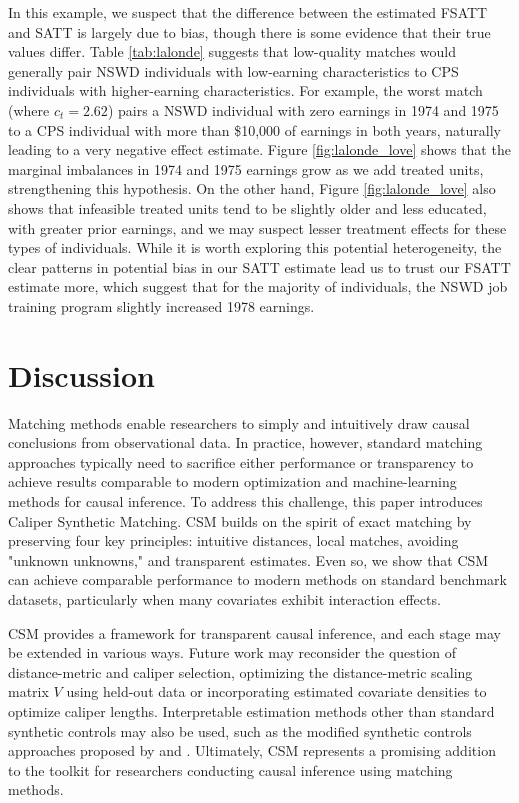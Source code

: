 \documentclass{article}
\begin{document}
In this example, we suspect that the difference between the estimated FSATT and SATT is largely due to bias, though there is some evidence that their true values differ.
Table \ref{tab:lalonde} suggests that low-quality matches would generally pair NSWD individuals with low-earning characteristics to CPS individuals with higher-earning characteristics.
For example, the worst match (where $c_t = 2.62$) pairs a NSWD individual with zero earnings in 1974 and 1975 to a CPS individual with more than \$10,000 of earnings in both years, naturally leading to a very negative effect estimate.
Figure \ref{fig:lalonde_love} shows that the marginal imbalances in 1974 and 1975 earnings grow as we add treated units, strengthening this hypothesis.
On the other hand, Figure \ref{fig:lalonde_love} also shows that infeasible treated units tend to be slightly older and less educated, with greater prior earnings, and we may suspect lesser treatment effects for these types of individuals.
While it is worth exploring this potential heterogeneity, the clear patterns in potential bias in our SATT estimate lead us to trust our FSATT estimate more, which suggest that for the majority of individuals, the NSWD job training program slightly increased 1978 earnings.


\section{Discussion}

Matching methods enable researchers to simply and intuitively draw causal conclusions from observational data.
In practice, however, standard matching approaches typically need to sacrifice either performance or transparency to achieve results comparable to modern optimization and machine-learning methods for causal inference.
To address this challenge, this paper introduces Caliper Synthetic Matching.
CSM builds on the spirit of exact matching by preserving four key principles: intuitive distances, local matches, avoiding "unknown unknowns," and transparent estimates.
Even so, we show that CSM can achieve comparable performance to modern methods on standard benchmark datasets, particularly when many covariates exhibit interaction effects.

CSM provides a framework for transparent causal inference, and each stage may be extended in various ways.
Future work may reconsider the question of distance-metric and caliper selection, optimizing the distance-metric scaling matrix $V$ using held-out data or incorporating estimated covariate densities to optimize caliper lengths.
Interpretable estimation methods other than standard synthetic controls may also be used, such as the modified synthetic controls approaches proposed by \citet{abadie2021penalized} and \citet{ben2021augmented}.
Ultimately, CSM represents a promising addition to the toolkit for researchers conducting causal inference using matching methods.
\end{document}
